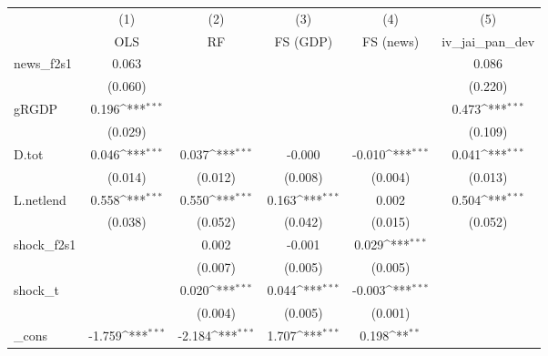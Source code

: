 {
\def\sym#1{\ifmmode^{#1}\else\(^{#1}\)\fi}
\begin{tabular}{l*{5}{c}}
\toprule
            &\multicolumn{1}{c}{(1)}&\multicolumn{1}{c}{(2)}&\multicolumn{1}{c}{(3)}&\multicolumn{1}{c}{(4)}&\multicolumn{1}{c}{(5)}\\
            &\multicolumn{1}{c}{OLS}&\multicolumn{1}{c}{RF}&\multicolumn{1}{c}{FS (GDP)}&\multicolumn{1}{c}{FS (news)}&\multicolumn{1}{c}{iv\_jai\_pan\_dev}\\
\midrule
news\_f2s1   &       0.063         &                     &                     &                     &       0.086         \\
            &     (0.060)         &                     &                     &                     &     (0.220)         \\
\addlinespace
gRGDP       &       0.196\sym{***}&                     &                     &                     &       0.473\sym{***}\\
            &     (0.029)         &                     &                     &                     &     (0.109)         \\
\addlinespace
D.tot       &       0.046\sym{***}&       0.037\sym{***}&      -0.000         &      -0.010\sym{***}&       0.041\sym{***}\\
            &     (0.014)         &     (0.012)         &     (0.008)         &     (0.004)         &     (0.013)         \\
\addlinespace
L.netlend   &       0.558\sym{***}&       0.550\sym{***}&       0.163\sym{***}&       0.002         &       0.504\sym{***}\\
            &     (0.038)         &     (0.052)         &     (0.042)         &     (0.015)         &     (0.052)         \\
\addlinespace
shock\_f2s1  &                     &       0.002         &      -0.001         &       0.029\sym{***}&                     \\
            &                     &     (0.007)         &     (0.005)         &     (0.005)         &                     \\
\addlinespace
shock\_t     &                     &       0.020\sym{***}&       0.044\sym{***}&      -0.003\sym{***}&                     \\
            &                     &     (0.004)         &     (0.005)         &     (0.001)         &                     \\
\addlinespace
\_cons      &      -1.759\sym{***}&      -2.184\sym{***}&       1.707\sym{***}&       0.198\sym{**} &                     \\

\end{tabular}}
